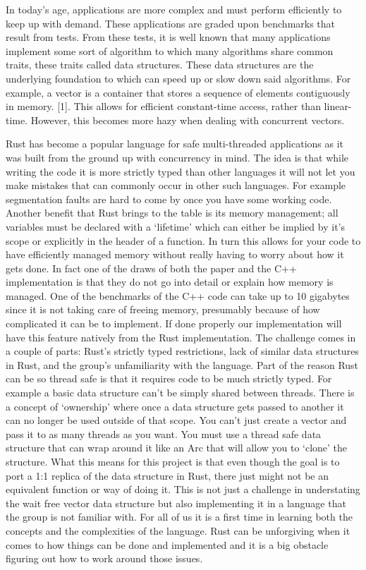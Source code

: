 \documentclass[conference]{IEEEtran}
\begin{document}
In today's age, applications are more complex and must perform efficiently to keep up with demand. These applications are graded upon benchmarks that result from tests. From these tests, it is well known that many applications implement some sort of algorithm to which many algorithms share common traits, these traits called data structures. These data structures are the underlying foundation to which can speed up or slow down said algorithms. For example, a vector is a container that stores a sequence of elements contiguously in memory. [1]. This allows for efficient constant-time access, rather than linear-time. However, this becomes more hazy when dealing with concurrent vectors.

Rust has become a popular language for safe multi-threaded applications as it was built from the ground up with concurrency in mind. The idea is that while writing the code it is more strictly typed than other languages it will not let you make mistakes that can commonly occur in other such languages. For example segmentation faults are hard to come by once you have some working code. 
Another benefit that Rust brings to the table is its memory management; all variables must be declared with a ‘lifetime’ which can either be implied by it’s scope or explicitly in the header of a function. In turn this allows for your code to have efficiently managed memory without really having to worry about how it gets done. In fact one of the draws of both the paper and the C++ implementation is that they do not go into detail or explain how memory is managed. One of the benchmarks of the C++ code can take up to 10 gigabytes since it is not taking care of freeing memory, presumably because of how complicated it can be to implement. If done properly our implementation will have this feature natively from the Rust implementation.
The challenge comes in a couple of parts: Rust’s strictly typed restrictions, lack of similar data structures in Rust, and the group’s unfamiliarity with the language.
Part of the reason Rust can be so thread safe is that it requires code to be much strictly typed. For example a basic data structure can’t be simply shared between threads. There is a concept of ‘ownership’ where once a data structure gets passed to another it can no longer be used outside of that scope. You can’t just create a vector and pass it to as many threads as you want. You must use a thread safe data structure that can wrap around it like an Arc that will allow you to ‘clone’ the structure. What this means for this project is that even though the goal is to port a 1:1 replica of the data structure in Rust, there just might not be an equivalent function or way of doing it.
This is not just a challenge in understating the wait free vector data structure but also implementing it in a language that the group is not familiar with. For all of us it is a first time in learning both the concepts and the complexities of the language. Rust can be unforgiving when it comes to how things can be done and implemented and it is a big obstacle figuring out how to work around those issues.
\end{document}
